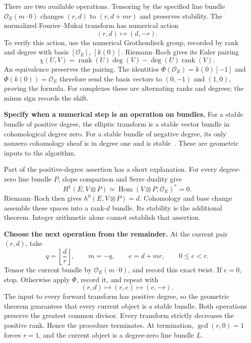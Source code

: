 \documentclass[11pt]{article}
\theoremstyle{remark}
\begin{document}
There are two available operations. Tensoring by the specified line bundle \(\mathcal O_E(m\cdot0)\) changes \((r,d)\) to \((r,d+mr)\) and preserves stability. The normalized Fourier--Mukai transform has numerical action
\begin{equation}
(r,d)\longmapsto(d,-r).
\label{categorical:rank-degree}
\end{equation}
To verify this action, use the numerical Grothendieck group, recorded by rank and degree with basis \([\mathcal O_E]\), \([k(0)]\). Riemann--Roch gives its Euler pairing
\[
\chi(U,V)=\operatorname{rank}(U)\deg(V)-\deg(U)\operatorname{rank}(V).
\]
An equivalence preserves the pairing. The identities \(\Phi(\mathcal O_E)=k(0)[-1]\) and \(\Phi(k(0))=\mathcal O_E\) therefore send the basis vectors to \((0,-1)\) and \((1,0)\), proving the formula. For complexes these are alternating ranks and degrees; the minus sign records the shift.

\textbf{Specify when a numerical step is an operation on bundles.}
For a stable bundle of positive degree, the elliptic transform is a stable vector bundle in cohomological degree zero. For a stable bundle of negative degree, its only nonzero cohomology sheaf is in degree one and is stable~\cite{ruiperez-tejero}. These are geometric inputs to the algorithm.

Part of the positive-degree assertion has a short explanation. For every degree-zero line bundle \(P\), slope comparison and Serre duality give
\[
H^1(E,V\otimes P)\simeq
\operatorname{Hom}(V\otimes P,\mathcal O_E)^*=0.
\]
Riemann--Roch then gives \(h^0(E,V\otimes P)=d\). Cohomology and base change assemble these spaces into a rank-\(d\) bundle. Its stability is the additional theorem. Integer arithmetic alone cannot establish that assertion.

\textbf{Choose the next operation from the remainder.}
At the current pair \((r,d)\), take
\[
q=\left\lfloor\frac dr\right\rfloor,\qquad
m=-q,\qquad e=d+mr,
\qquad 0\le e<r.
\]
Tensor the current bundle by \(\mathcal O_E(m\cdot0)\), and record this exact twist. If \(e=0\), stop. Otherwise apply \(\Phi\), record it, and repeat with
\[
(r,d)\longmapsto(r,e)\longmapsto(e,-r).
\]
The input to every forward transform has positive degree, so the geometric theorem guarantees that every current object is a stable bundle. Both operations preserve the greatest common divisor. Every transform strictly decreases the positive rank. Hence the procedure terminates. At termination, \(\gcd(r,0)=1\) forces \(r=1\), and the current object is a degree-zero line bundle \(L\).
\end{document}
